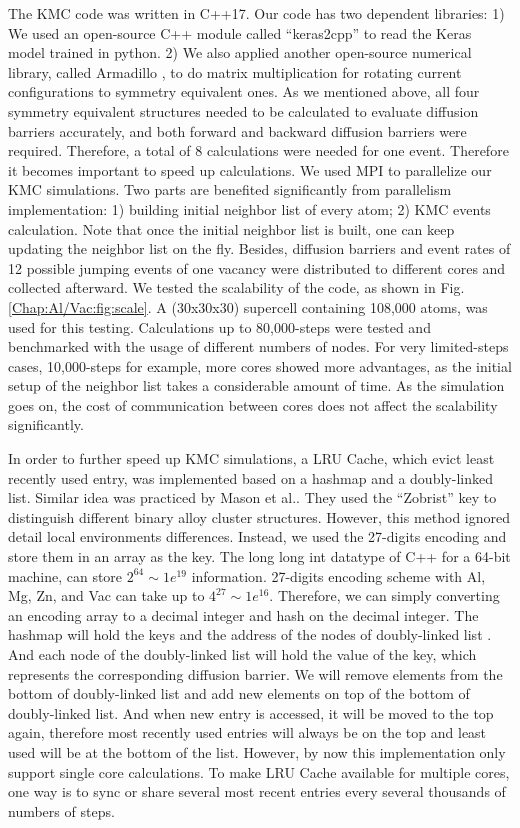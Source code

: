 The \ac{KMC} code was written in C++17. \cite{Zhang2020KNN2} Our code has two dependent libraries: 1) We used an open-source C++ module called ``keras2cpp'' to read the Keras model trained in python. \cite{Perevozchikov2019} 2) We also applied another open-source numerical library, called Armadillo \cite{sanderson2016armadillo, sanderson2018user}, to do matrix multiplication for rotating current configurations to symmetry equivalent ones. As we mentioned above, all four symmetry equivalent structures needed to be calculated to evaluate diffusion barriers accurately, and both forward and backward diffusion barriers were required. Therefore, a total of 8 calculations were needed for one event. Therefore it becomes important to speed up calculations. We used \ac{MPI} to parallelize our \ac{KMC} simulations. Two parts are benefited significantly from parallelism implementation: 1) building initial neighbor list of every atom; 2) \ac{KMC} events calculation. Note that once the initial neighbor list is built, one can keep updating the neighbor list on the fly. Besides, diffusion barriers and event rates of 12 possible jumping events of one vacancy were distributed to different cores and collected afterward. We tested the scalability of the code, as shown in Fig. \ref{Chap:Al/Vac:fig:scale}. A (30x30x30) supercell containing 108,000 atoms, was used for this testing. Calculations up to 80,000-steps were tested and benchmarked with the usage of different numbers of nodes. For very limited-steps cases, 10,000-steps for example, more cores showed more advantages, as the initial setup of the neighbor list takes a considerable amount of time. As the simulation goes on, the cost of communication between cores does not affect the scalability significantly.


In order to further speed up \ac{KMC} simulations, a \acf{LRU} Cache, which evict least recently used entry, was implemented based on a hashmap and a  doubly-linked list. Similar idea was practiced by Mason et al.\cite{mason2005fast}. They used the ``Zobrist'' key to distinguish different binary alloy cluster structures. However, this method ignored detail local environments differences. Instead, we used the 27-digits encoding and store them in an array as the key. The long long int datatype of C++ for a 64-bit machine, can store $2^{64} \sim 1e^{19}$ information. 27-digits encoding scheme with Al, Mg, Zn, and Vac can take up to $4^{27} \sim 1e^{16}$. Therefore, we can simply converting an encoding array to a decimal integer and hash on the decimal integer. The hashmap will hold the keys and the address of the nodes of doubly-linked list . And each node of the doubly-linked list will hold the value of the key, which represents the corresponding diffusion barrier. We will remove elements from the bottom of doubly-linked list and add new elements on top of the bottom of doubly-linked list. And when new entry is accessed, it will be moved to the top again, therefore most recently used entries will always be on the top and least used will be at the bottom of the list. However, by now this implementation only support single core calculations. To make \ac{LRU} Cache available for multiple cores, one way is to sync or share several most recent entries every several thousands of numbers of steps.


